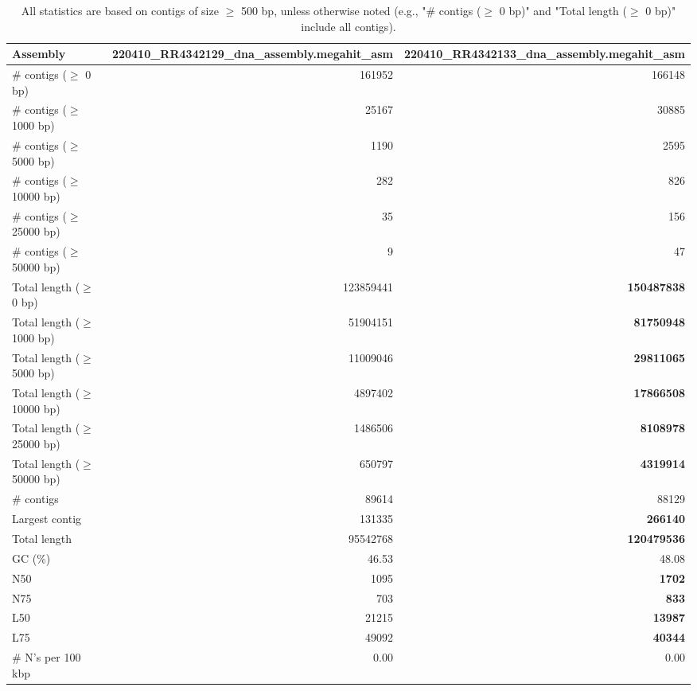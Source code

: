 \documentclass[12pt,a4paper]{article}
\begin{document}
\begin{table}[ht]
\begin{center}
\caption{All statistics are based on contigs of size $\geq$ 500 bp, unless otherwise noted (e.g., "\# contigs ($\geq$ 0 bp)" and "Total length ($\geq$ 0 bp)" include all contigs).}
\begin{tabular}{|l*{2}{|r}|}
\hline
Assembly & 220410\_RR4342129\_dna\_assembly.megahit\_asm & 220410\_RR4342133\_dna\_assembly.megahit\_asm \\ \hline
\# contigs ($\geq$ 0 bp) & 161952 & 166148 \\ \hline
\# contigs ($\geq$ 1000 bp) & 25167 & 30885 \\ \hline
\# contigs ($\geq$ 5000 bp) & 1190 & 2595 \\ \hline
\# contigs ($\geq$ 10000 bp) & 282 & 826 \\ \hline
\# contigs ($\geq$ 25000 bp) & 35 & 156 \\ \hline
\# contigs ($\geq$ 50000 bp) & 9 & 47 \\ \hline
Total length ($\geq$ 0 bp) & 123859441 & {\bf 150487838} \\ \hline
Total length ($\geq$ 1000 bp) & 51904151 & {\bf 81750948} \\ \hline
Total length ($\geq$ 5000 bp) & 11009046 & {\bf 29811065} \\ \hline
Total length ($\geq$ 10000 bp) & 4897402 & {\bf 17866508} \\ \hline
Total length ($\geq$ 25000 bp) & 1486506 & {\bf 8108978} \\ \hline
Total length ($\geq$ 50000 bp) & 650797 & {\bf 4319914} \\ \hline
\# contigs & 89614 & 88129 \\ \hline
Largest contig & 131335 & {\bf 266140} \\ \hline
Total length & 95542768 & {\bf 120479536} \\ \hline
GC (\%) & 46.53 & 48.08 \\ \hline
N50 & 1095 & {\bf 1702} \\ \hline
N75 & 703 & {\bf 833} \\ \hline
L50 & 21215 & {\bf 13987} \\ \hline
L75 & 49092 & {\bf 40344} \\ \hline
\# N's per 100 kbp & 0.00 & 0.00 \\ \hline
\end{tabular}
\end{center}
\end{table}
\end{document}
